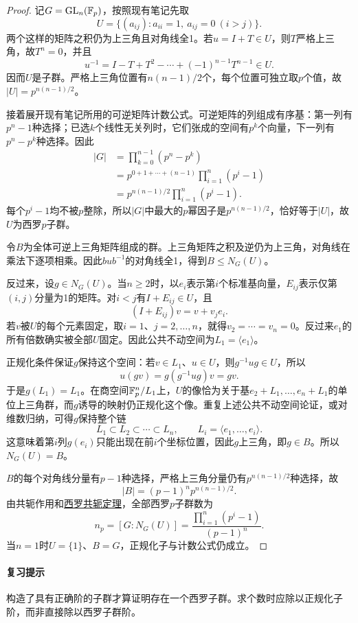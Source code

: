 \documentclass[UTF8,a4paper,11pt,fontset=windows]{ctexart}
\DeclareMathOperator{\GL}{GL}\DeclareMathOperator{\SL}{SL}
\newcommand{\proofref}[2]{\hyperref[note:#1]{#2}}
\begin{document}
\begin{proof}
记$G=\GL_n(\F_p)$，按照现有笔记先取
\[
U=\{(a_{ij}):a_{ii}=1,\ a_{ij}=0\ (i>j)\}.
\]
两个这样的矩阵之积仍为上三角且对角线全1。若$u=I+T\in U$，则$T$严格上三角，故$T^n=0$，并且
\[
u^{-1}=I-T+T^2-\cdots+(-1)^{n-1}T^{n-1}\in U.
\]
因而$U$是子群。严格上三角位置有$n(n-1)/2$个，每个位置可独立取$p$个值，故$|U|=p^{n(n-1)/2}$。

接着展开现有笔记所用的可逆矩阵计数公式。可逆矩阵的列组成有序基：第一列有$p^n-1$种选择；已选$k$个线性无关列时，它们张成的空间有$p^k$个向量，下一列有$p^n-p^k$种选择。因此
\begin{align*}
|G|&=\prod_{k=0}^{n-1}(p^n-p^k)\\
&=p^{0+1+\cdots+(n-1)}\prod_{i=1}^n(p^i-1)\\
&=p^{n(n-1)/2}\prod_{i=1}^n(p^i-1).
\end{align*}
每个$p^i-1$均不被$p$整除，所以$|G|$中最大的$p$幂因子是$p^{n(n-1)/2}$，恰好等于$|U|$，故$U$为西罗$p$子群。

令$B$为全体可逆上三角矩阵组成的群。上三角矩阵之积及逆仍为上三角，对角线在乘法下逐项相乘。因此$bub^{-1}$的对角线全1，得到$B\le N_G(U)$。

反过来，设$g\in N_G(U)$。当$n\ge2$时，以$e_i$表示第$i$个标准基向量，$E_{ij}$表示仅第$(i,j)$分量为1的矩阵。对$i<j$有$I+E_{ij}\in U$，且
\[
(I+E_{ij})v=v+v_je_i.
\]
若$v$被$U$的每个元素固定，取$i=1$、$j=2,\ldots,n$，就得$v_2=\cdots=v_n=0$。反过来$e_1$的所有倍数确实被全部$U$固定。因此公共不动空间为$L_1=\langle e_1\rangle$。

正规化条件保证$g$保持这个空间：若$v\in L_1$、$u\in U$，则$g^{-1}ug\in U$，所以
\[
u(gv)=g(g^{-1}ug)v=gv.
\]
于是$g(L_1)=L_1$。在商空间$\mathbb F_p^n/L_1$上，$U$的像恰为关于基$e_2+L_1,\ldots,e_n+L_1$的单位上三角群，而$g$诱导的映射仍正规化这个像。重复上述公共不动空间论证，或对维数归纳，可得$g$保持整个链
\[
L_1\subset L_2\subset\cdots\subset L_n,
\qquad L_i=\langle e_1,\ldots,e_i\rangle.
\]
这意味着第$i$列$g(e_i)$只能出现在前$i$个坐标位置，因此$g$上三角，即$g\in B$。所以$N_G(U)=B$。

$B$的每个对角线分量有$p-1$种选择，严格上三角分量仍有$p^{n(n-1)/2}$种选择，故
\[
|B|=(p-1)^np^{n(n-1)/2}.
\]
由共轭作用和\proofref{sylow2}{西罗共轭定理}，全部西罗$p$子群数为
\[
n_p=[G:N_G(U)]
=\frac{\prod_{i=1}^n(p^i-1)}{(p-1)^n}.
\]
当$n=1$时$U=\{1\}$、$B=G$，正规化子与计数公式仍成立。
\end{proof}

\paragraph{复习提示}
构造了具有正确阶的子群才算证明存在一个西罗子群。求个数时应除以正规化子阶，而非直接除以西罗子群阶。
\end{document}
